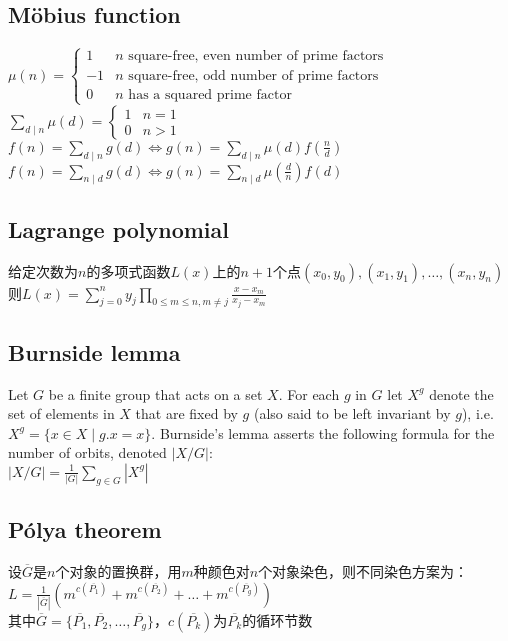 \subsection*{Möbius function}
    $ \mu(n) = \begin{cases}
        1 & n \text{ square-free, even number of prime factors}\\
        -1 & n \text{ square-free, odd number of prime factors}\\
        0 & n \text{ has a squared prime factor}
    \end{cases} $
    \\$ \sum\limits_{d \mid n} \mu(d) = \begin{cases}
        1 & n = 1\\
        0 & n > 1
    \end{cases} $
    \\$ f(n) = \sum\limits_{d \mid n} g(d) \Leftrightarrow g(n) = \sum\limits_{d \mid n} \mu(d) f(\frac{n}{d}) $
    \\$ f(n) = \sum\limits_{n \mid d} g(d) \Leftrightarrow g(n) = \sum\limits_{n \mid d} \mu(\frac{d}{n}) f(d) $

\subsection*{Lagrange polynomial}
    给定次数为$ n $的多项式函数$ L(x) $上的$ n + 1 $个点$ (x_0, y_0), (x_1, y_1), \dots, (x_n, y_n) $
    \\则$ L(x) = \sum\limits_{j = 0}^{n} y_j \prod\limits_{0 \leq m \leq n, m \ne j} \frac{x - x_m}{x_j - x_m} $

\subsection*{Burnside lemma}
    Let $ G $ be a finite group that acts on a set $ X $. For each $ g $ in $ G $ let $ X^g $ denote the set of elements in $ X $ that are fixed by $ g $ (also said to be left invariant by $ g $), i.e. $ X^g = \lbrace x \in X \mid g.x = x \rbrace $. Burnside's lemma asserts the following formula for the number of orbits, denoted $ \left| X / G \right| $:
    \\$ \left| X / G \right| = \frac{1}{\left| G \right|} \sum\limits_{g \in G}^{} \left| X^g \right| $

\subsection*{Pólya theorem}
    设$ \overline{G} $是$ n $个对象的置换群，用$ m $种颜色对$ n $个对象染色，则不同染色方案为：
    \\$ L = \frac{1}{\left| \overline{G} \right|} (m^{c(\overline{P_1})} + m^{c(\overline{P_2})} + \dots + m^{c(\overline{P_g})}) $
    \\其中$ \overline{G} = \lbrace \overline{P_1}, \overline{P_2}, \dots, \overline{P_g} \rbrace $，$ c(\overline{P_k}) $为$ \overline{P_k} $的循环节数
